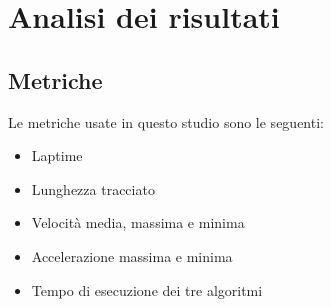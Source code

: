 
\chapter{Analisi dei risultati}

\section{Metriche}
Le metriche usate in questo studio sono le seguenti:
\begin{itemize}
	\item Laptime 
	\item Lunghezza tracciato 
	\item Velocità media, massima e minima
	\item Accelerazione massima e minima
	\item Tempo di esecuzione dei tre algoritmi
\end{itemize}


